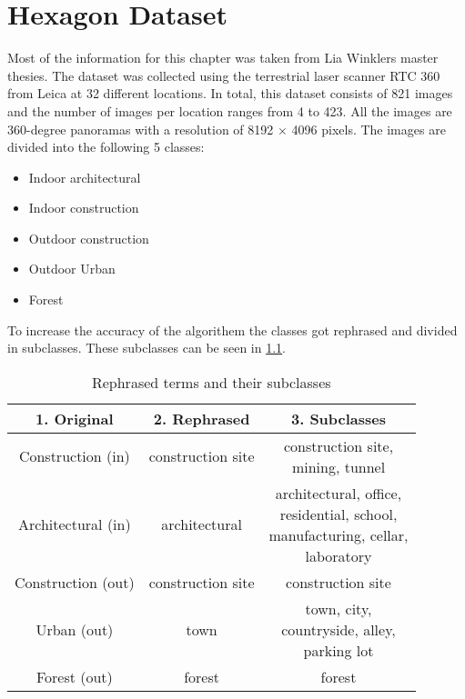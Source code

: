 \chapter{Hexagon Dataset
    \label{chapter:dataset}}
Most of the information for this chapter was taken from Lia Winklers master thesies.
The dataset was collected using the terrestrial laser scanner RTC 360 from Leica at 32 different locations.
In total, this dataset consists of 821 images and the number of images per location ranges from 4 to 423.
All the images are 360-degree panoramas with a
resolution of 8192 \(\times\) 4096 pixels.
The images are divided into the following 5 classes:

\begin{itemize}
    \item Indoor architectural
    \item Indoor construction
    \item Outdoor construction
    \item Outdoor Urban
    \item Forest
\end{itemize}

\noindent
To increase the accuracy of the algorithem the classes got rephrased and divided in subclasses.
These subclasses can be seen in \cref{tab:dataset:subclasses}.
\begin{table}[!ht]
    \centering
    \begin{tabular}{ccc}
    \toprule
    \textbf{1. Original}& \textbf{2. Rephrased}& \textbf{3. Subclasses}\\ \midrule
    Construction (in) & construction site & \makecell{construction site,\\ mining, tunnel}\\ \hline
    Architectural (in)& architectural& \makecell{architectural, office,\\ residential, school,\\ manufacturing, cellar,\\ laboratory} \\ \hline
    Construction (out)& construction site & construction site \\ \hline
    Urban (out)& town & \makecell{town, city,\\countryside, alley,\\ parking lot} \\ \hline
    Forest (out)& forest& forest \\
    \bottomrule
    \end{tabular}
    \caption{Rephrased terms and their subclasses
        \label{tab:dataset:subclasses}}
\end{table}

